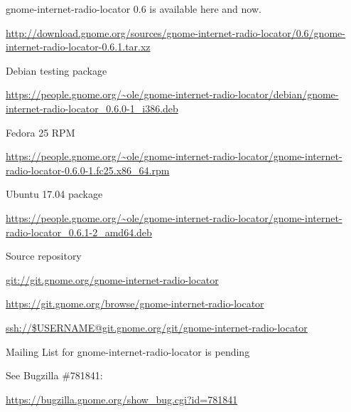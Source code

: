 \documentclass[20pt,landscape]{foils}
\begin{document}

\begin{list1}
\item gnome-internet-radio-locator 0.6 is available here and now.
  \begin{list2}
  \item \begin{tiny}\url{http://download.gnome.org/sources/gnome-internet-radio-locator/0.6/gnome-internet-radio-locator-0.6.1.tar.xz}\end{tiny}
  \end{list2}
\item Debian testing package
  \begin{list2}
  \item \begin{tiny}\url{https://people.gnome.org/~ole/gnome-internet-radio-locator/debian/gnome-internet-radio-locator_0.6.0-1_i386.deb}\end{tiny}
  \end{list2}
\item Fedora 25 RPM
  \begin{list2}
  \item \begin{tiny}\url{https://people.gnome.org/~ole/gnome-internet-radio-locator/gnome-internet-radio-locator-0.6.0-1.fc25.x86_64.rpm}\end{tiny}
  \end{list2}
\item Ubuntu 17.04 package
  \begin{list2}
  \item \begin{tiny}\url{https://people.gnome.org/~ole/gnome-internet-radio-locator/gnome-internet-radio-locator_0.6.1-2_amd64.deb}\end{tiny}
  \end{list2}
\item Source repository
  \begin{list2}
    \item \url{git://git.gnome.org/gnome-internet-radio-locator}
    \item \url{https://git.gnome.org/browse/gnome-internet-radio-locator}
    \item \url{ssh://$USERNAME@git.gnome.org/git/gnome-internet-radio-locator}
  \end{list2}
\item Mailing List for gnome-internet-radio-locator is pending\\
  \begin{list2}
  \item See Bugzilla \#781841: \begin{tiny}\url{https://bugzilla.gnome.org/show_bug.cgi?id=781841}\begin{verbatim}


\end{verbatim}
\end{tiny}
\end{list2}
\end{list1}
\end{document}
